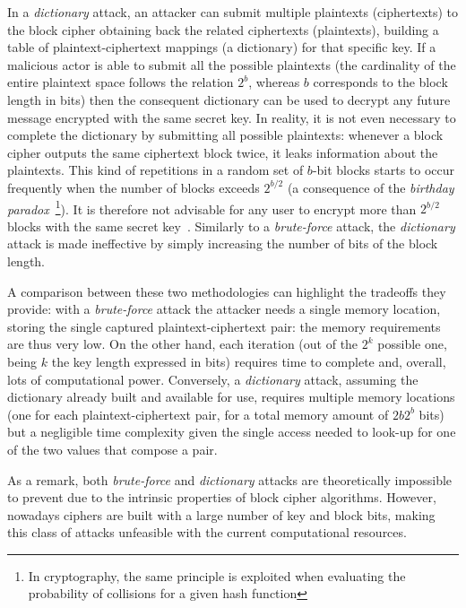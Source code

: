         In a \emph{dictionary} attack, an attacker can submit multiple plaintexts (ciphertexts) to the block cipher obtaining back the related ciphertexts (plaintexts), building a table of plaintext-ciphertext mappings (a dictionary) for that specific key. If a malicious actor is able to submit all the possible plaintexts (the cardinality of the entire plaintext space follows the relation $2^b$, whereas $b$ corresponds to the block length in bits) then the consequent dictionary can be used to decrypt any future message encrypted with the same secret key.
        In reality, it is not even necessary to complete the dictionary by submitting all possible plaintexts: whenever a block cipher outputs the same ciphertext block twice, it leaks information about the plaintexts. This kind of repetitions in a random set of $b$-bit blocks starts to occur frequently when the number of blocks exceeds $2^{b/2}$ (a consequence of the \emph{birthday paradox}~\footnote{In cryptography, the same principle is exploited when evaluating the probability of collisions for a given hash function}). It is therefore not advisable for any user to encrypt more than $2^{b/2}$ blocks with the same secret key~\cite{sakiyama2016security}. Similarly to a \emph{brute-force} attack, the \emph{dictionary} attack is made ineffective by simply increasing the number of bits of the block length.

        A comparison between these two methodologies can highlight the tradeoffs they provide: with a \emph{brute-force} attack the attacker needs a single memory location, storing the single captured plaintext-ciphertext pair: the memory requirements are thus very low. On the other hand, each iteration (out of the $2^k$ possible one, being $k$ the key length expressed in bits) requires time to complete and, overall, lots of computational power. Conversely, a \emph{dictionary} attack, assuming the dictionary already built and available for use, requires multiple memory locations (one for each plaintext-ciphertext pair, for a total memory amount of $2b2^b$ bits) but a negligible time complexity given the single access needed to look-up for one of the two values that compose a pair.

        As a remark, both \emph{brute-force} and \emph{dictionary} attacks are theoretically impossible to prevent due to the intrinsic properties of block cipher algorithms. However, nowadays ciphers are built with a large number of key and block bits, making this class of attacks unfeasible with the current computational resources.

